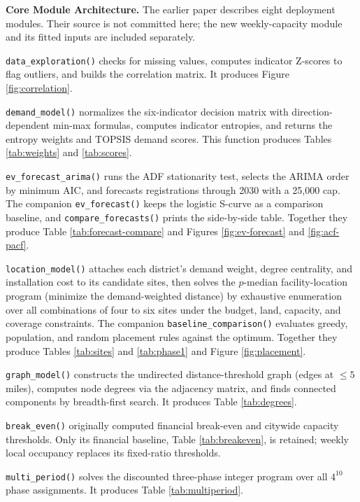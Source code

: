 \documentclass[12pt]{article}
\begin{document}
\noindent\textbf{Core Module Architecture.} The earlier paper describes eight deployment modules. Their source is not committed
here; the new weekly-capacity module and its fitted inputs are included separately.

\texttt{data\_exploration()} checks for missing values, computes indicator Z-scores to flag
outliers, and builds the correlation matrix. It produces Figure \ref{fig:correlation}.

\texttt{demand\_model()} normalizes the six-indicator decision matrix with
direction-dependent min-max formulas, computes indicator entropies, and returns the
entropy weights and TOPSIS demand scores. This function produces Tables
\ref{tab:weights} and \ref{tab:scores}.

\texttt{ev\_forecast\_arima()} runs the ADF stationarity test, selects the ARIMA order by
minimum AIC, and forecasts registrations through 2030 with a 25,000 cap. The companion
\texttt{ev\_forecast()} keeps the logistic S-curve as a comparison baseline, and
\texttt{compare\_forecasts()} prints the side-by-side table. Together they produce Table
\ref{tab:forecast-compare} and Figures \ref{fig:ev-forecast} and \ref{fig:acf-pacf}.

\texttt{location\_model()} attaches each district's demand weight, degree centrality, and
installation cost to its candidate sites, then solves the $p$-median facility-location
program (minimize the demand-weighted distance) by exhaustive enumeration over all
combinations of four to six sites under the budget, land, capacity, and coverage
constraints. The companion \texttt{baseline\_comparison()} evaluates greedy, population,
and random placement rules against the optimum. Together they produce Tables
\ref{tab:sites} and \ref{tab:phase1} and Figure \ref{fig:placement}.

\texttt{graph\_model()} constructs the undirected distance-threshold graph (edges at
$\leq 5$ miles), computes node degrees via the adjacency matrix, and finds connected
components by breadth-first search. It produces Table \ref{tab:degrees}.

\texttt{break\_even()} originally computed financial break-even and citywide
capacity thresholds. Only its financial baseline, Table \ref{tab:breakeven}, is retained;
weekly local occupancy replaces its fixed-ratio thresholds.

\texttt{multi\_period()} solves the discounted three-phase integer program over all
$4^{10}$ phase assignments. It produces Table \ref{tab:multiperiod}.
\end{document}

